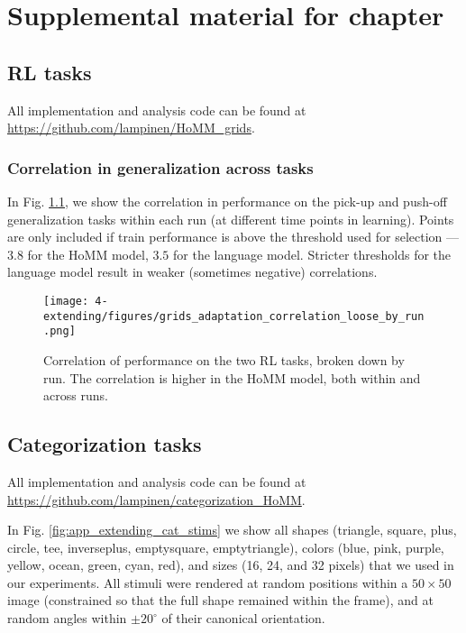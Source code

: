 \chapter{Supplemental material for chapter } \label{appendix:extending}

\section{RL tasks} \label{app:extending_grids_methods}

All implementation and analysis code can be found at \url{https://github.com/lampinen/HoMM_grids}.\par


\subsection{Correlation in generalization across tasks}
In Fig. \ref{fig:app_extending:RL_correlation_by_run}, we show the correlation in performance on the pick-up and push-off generalization tasks within each run (at different time points in learning). Points are only included if train performance is above the threshold used for selection --- \(3.8\) for the HoMM model, \(3.5\) for the language model. Stricter thresholds for the language model result in weaker (sometimes negative) correlations. \par 
\begin{figure}
\centering
\texttt{[image: 4-extending/figures/grids\_adaptation\_correlation\_loose\_by\_run.png]}
\caption[Correlation of performance on the RL tasks, by run.]{Correlation of performance on the two RL tasks, broken down by run. The correlation is higher in the HoMM model, both within and across runs.} \label{fig:app_extending:RL_correlation_by_run}
\end{figure}


\section{Categorization tasks} \label{app:extending_categorization_methods}
All implementation and analysis code can be found at \url{https://github.com/lampinen/categorization_HoMM}.\par
In Fig. \ref{fig:app_extending_cat_stims} we show all shapes (triangle, square, plus, circle, tee, inverseplus, emptysquare, emptytriangle), colors (blue, pink, purple, yellow, ocean, green, cyan, red), and sizes (16, 24, and 32 pixels) that we used in our experiments. All stimuli were rendered at random positions within a \(50 \times 50\) image (constrained so that the full shape remained within the frame), and at random angles within \(\pm20^{\circ}\) of their canonical orientation.\par

